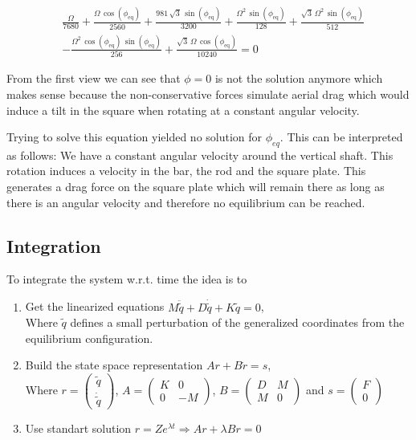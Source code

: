 \begin{equation}
    \begin{split}
        &\frac{\Omega }{7680}+\frac{\Omega \,\cos\left(\phi _{\mathrm{eq}}\right)}{2560}+\frac{981\,\sqrt{3}\,\sin\left(\phi _{\mathrm{eq}}\right)}{3200}+\frac{\Omega ^2\,\sin\left(\phi _{\mathrm{eq}}\right)}{128}+\frac{\sqrt{3}\,\Omega ^2\,\sin\left(\phi _{\mathrm{eq}}\right)}{512}\\
        &-\frac{\Omega ^2\,\cos\left(\phi _{\mathrm{eq}}\right)\,\sin\left(\phi _{\mathrm{eq}}\right)}{256}+\frac{\sqrt{3}\,\Omega \,\cos\left(\phi _{\mathrm{eq}}\right)}{10240} = 0
    \end{split}
\end{equation}

From the first view we can see that $\phi = 0$ is not the solution anymore which makes sense because the non-conservative forces simulate aerial drag which would induce a tilt in the square when rotating at a constant angular velocity.

Trying to solve this equation yielded no solution for $\phi_{eq}$. This can be interpreted as follows: We have a constant angular velocity around the vertical shaft. This rotation induces a velocity in the bar, the rod and the square plate. This generates a drag force on the square plate which will remain there as long as there is an angular velocity and therefore no equilibrium can be reached.



\subsection{Integration}

To integrate the system w.r.t. time the idea is to 
\begin{enumerate}
    \item Get the linearized equations $M\ddot {\tilde {q}} + D\dot {\tilde {q}} + K\tilde {q} = 0$, \\
    Where $\tilde q$ defines a small perturbation of the generalized coordinates from the equilibrium configuration.
    \item Build the state space representation $Ar + B\dot r = s$,\\
    Where $r = \begin{pmatrix}
        \tilde {q}\\
        \dot {\tilde {q}}
    \end{pmatrix}$, $A = \begin{pmatrix}
        K & 0\\
        0 & -M
    \end{pmatrix}$, $B = \begin{pmatrix}
        D & M\\
        M & 0
    \end{pmatrix}$ and $s = \begin{pmatrix}
        F\\0
    \end{pmatrix}$
    \item Use standart solution $r = Ze^{\lambda t} \Rightarrow Ar + \lambda B r = 0$ 
\end{enumerate}